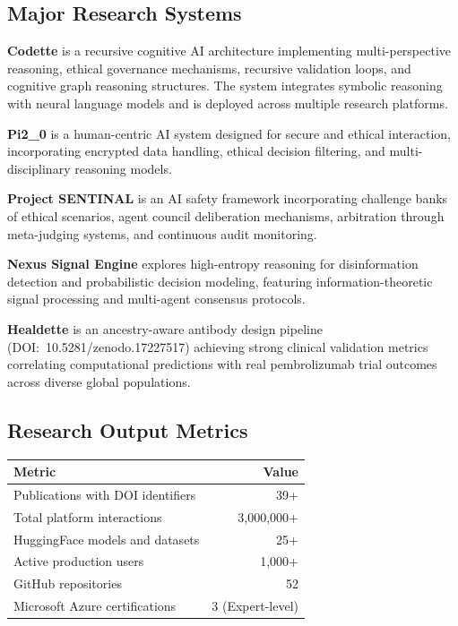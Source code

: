 \documentclass[11pt,a4paper]{article}
\begin{document}
\subsection{Major Research Systems}
\textbf{Codette} is a recursive cognitive AI architecture implementing multi-perspective reasoning, ethical governance mechanisms, recursive validation loops, and cognitive graph reasoning structures. The system integrates symbolic reasoning with neural language models and is deployed across multiple research platforms.

\textbf{Pi2\_0} is a human-centric AI system designed for secure and ethical interaction, incorporating encrypted data handling, ethical decision filtering, and multi-disciplinary reasoning models.

\textbf{Project SENTINAL} is an AI safety framework incorporating challenge banks of ethical scenarios, agent council deliberation mechanisms, arbitration through meta-judging systems, and continuous audit monitoring.

\textbf{Nexus Signal Engine} explores high-entropy reasoning for disinformation detection and probabilistic decision modeling, featuring information-theoretic signal processing and multi-agent consensus protocols.

\textbf{Healdette} is an ancestry-aware antibody design pipeline (DOI:~10.5281/zenodo.17227517) achieving strong clinical validation metrics correlating computational predictions with real pembrolizumab trial outcomes across diverse global populations.

\subsection{Research Output Metrics}
\begin{table}[H]
\centering
\begin{tabular}{@{}lr@{}}
\toprule
\textbf{Metric} & \textbf{Value} \\
\midrule
Publications with DOI identifiers & 39+ \\
Total platform interactions       & 3,000,000+ \\
HuggingFace models and datasets   & 25+ \\
Active production users            & 1,000+ \\
GitHub repositories                & 52 \\
Microsoft Azure certifications     & 3 (Expert-level) \\
\bottomrule
\end{tabular}
\end{table}
\end{document}
